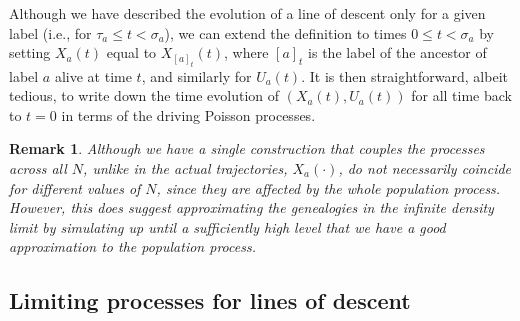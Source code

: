 \documentclass[12pt]{article}
\newtheorem{remark}[theorem]{Remark}
\numberwithin{equation}{section}
\begin{document}
Although we have described the evolution of a line of descent only for a given label
(i.e., for $\tau_a \le t < \sigma_a$),
we can extend the definition to times
$0 \le t < \sigma_a$ by setting
$X_a(t)$ equal to $X_{[a]_t}(t)$,
where $[a]_t$ is the label of the ancestor of label $a$ alive at time $t$,
and similarly for $U_a(t)$.
It is then straightforward, albeit tedious,
to write down the time evolution of $(X_a(t), U_a(t))$ for all time back 
to $t=0$
in terms of the driving Poisson processes.

\begin{remark}
Although we have a single construction that couples the processes across all $N$,
unlike in \citet{kurtz/rodrigues:2011} the actual trajectories, $X_a(\cdot)$,
do not necessarily coincide for different values of $N$,
since they are affected by the whole population process.
However, this does suggest approximating the genealogies in the infinite density limit
by simulating up until a sufficiently high level
that we have a good approximation to the population process.
\end{remark}


\subsection{Limiting processes for lines of descent}
\label{sec:limiting_lines_of_descent}
\end{document}
